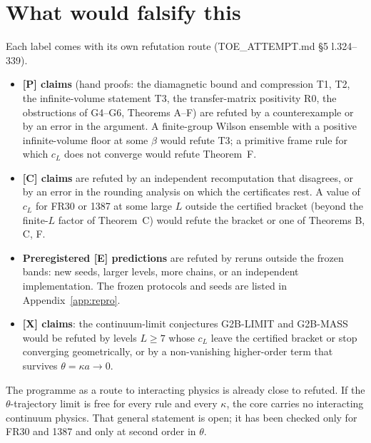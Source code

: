 \documentclass[11pt]{article}
\begin{document}
\section{What would falsify this}\label{sec:falsify}
Each label comes with its own refutation route (TOE\_ATTEMPT.md \S5 l.324--339).
\begin{itemize}
\item \textbf{[P] claims} (hand proofs: the diamagnetic bound and compression T1, T2, the infinite-volume statement T3, the transfer-matrix positivity R0, the obstructions of G4--G6, Theorems A--F) are refuted by a counterexample or by an error in the argument. A finite-group Wilson ensemble with a positive infinite-volume floor at some $\beta$ would refute T3; a primitive frame rule for which $c_L$ does not converge would refute Theorem~F.
\item \textbf{[C] claims} are refuted by an independent recomputation that disagrees, or by an error in the rounding analysis on which the certificates rest. A value of $c_L$ for FR30 or 1387 at some large $L$ outside the certified bracket (beyond the finite-$L$ factor of Theorem~C) would refute the bracket or one of Theorems B, C, F.
\item \textbf{Preregistered [E] predictions} are refuted by reruns outside the frozen bands: new seeds, larger levels, more chains, or an independent implementation. The frozen protocols and seeds are listed in Appendix~\ref{app:repro}.
\item \textbf{[X] claims}: the continuum-limit conjectures G2B-LIMIT and G2B-MASS would be refuted by levels $L\ge7$ whose $c_L$ leave the certified bracket or stop converging geometrically, or by a non-vanishing higher-order term that survives $\theta=\kappa a\to0$.
\end{itemize}
The programme as a route to interacting physics is already close to refuted. If the $\theta$-trajectory limit is free for every rule and every $\kappa$, the core carries no interacting continuum physics. That general statement is open; it has been checked only for FR30 and 1387 and only at second order in $\theta$.
\end{document}
